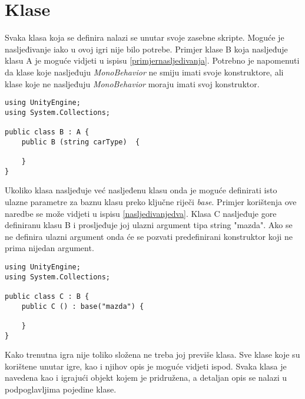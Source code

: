 \section{Klase}
Svaka klasa koja se definira nalazi se unutar svoje zasebne skripte. Moguće je nasljeđivanje iako u ovoj igri nije bilo potrebe. Primjer klase B koja nasljeđuje klasu A je moguće vidjeti u ispisu \ref{primjernasljedivanja}. Potrebno je napomenuti da klase koje nasljeđuju \emph{MonoBehavior} ne smiju imati svoje konstruktore, ali klase koje ne nasljeđuju \emph{MonoBehavior} moraju imati svoj konstruktor. 
\begin{lstlisting}[caption={Primjer nasljeđivanja}, label=primjernasljedivanja]
using UnityEngine;
using System.Collections;

public class B : A {
	public B (string carType)  {
	
	}	
}
\end{lstlisting}
Ukoliko klasa nasljeđuje već nasljeđenu klasu onda je moguće definirati isto ulazne parametre za baznu klasu preko ključne riječi \emph{base}. Primjer korištenja ove naredbe se može vidjeti u ispisu \ref{nasljedivanjedva}. Klasa C nasljeđuje gore definiranu klasu B i prosljeđuje joj ulazni argument tipa string "mazda". Ako se ne definira ulazni argument onda će se pozvati predefinirani konstruktor koji ne prima nijedan argument.

\begin{lstlisting}[caption={Primjer nasljeđivanja nasljeđene klase}, label=nasljedivanjedva]
using UnityEngine;
using System.Collections;

public class C : B {
	public C () : base("mazda") {
	
	}	
}
\end{lstlisting}

Kako trenutna igra nije toliko složena ne treba joj previše klasa. Sve klase koje su korištene unutar igre, kao i njihov opis je moguće vidjeti ispod. Svaka klasa je navedena kao i igrajući objekt kojem je pridružena, a detaljan opis se nalazi u podpoglavljima pojedine klase.
\newpage


